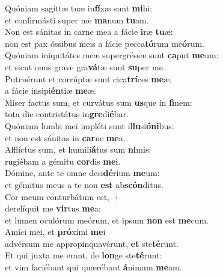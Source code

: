 \evenverse Quóniam sagíttæ tuæ in\textbf{fí}xæ sunt \textbf{mi}hi:~\*\\
\evenverse et confirmásti super me \textbf{ma}num \textbf{tu}am.\\
\oddverse Non est sánitas in carne mea a fácie \textbf{i}ræ \textbf{tu}æ:~\*\\
\oddverse non est pax óssibus meis a fácie pecca\textbf{tó}rum me\textbf{ó}rum.\\
\evenverse Quóniam iniquitátes meæ supergréssæ sunt \textbf{ca}put \textbf{me}um:~\*\\
\evenverse et sicut onus grave gra\textbf{vá}tæ sunt \textbf{su}per me.\\
\oddverse Putruérunt et corrúptæ sunt cica\textbf{trí}ces \textbf{me}æ,~\*\\
\oddverse a fácie insipi\textbf{én}tiæ \textbf{me}æ.\\
\evenverse Miser factus sum, et curvátus sum \textbf{us}que in \textbf{fi}nem:~\*\\
\evenverse tota die contristátus in\textbf{gre}di\textbf{é}bar.\\
\oddverse Quóniam lumbi mei impléti sunt il\textbf{lu}si\textbf{ó}\textbf{ni}bus:~\*\\
\oddverse et non est sánitas in \textbf{car}ne \textbf{me}a.\\
\evenverse Afflíctus sum, et humili\textbf{á}tus sum \textbf{ni}mis:~\*\\
\evenverse rugiébam a gémitu \textbf{cor}dis \textbf{me}i.\\
\oddverse Dómine, ante te omne desi\textbf{dé}rium \textbf{me}um:~\*\\
\oddverse et gémitus meus a te non \textbf{est} ab\textbf{scón}ditus.\\
\evenverse Cor meum conturbátum est,~+\\
\evenverse  derelíquit me \textbf{vir}tus \textbf{me}a:~\*\\
\evenverse et lumen oculórum meórum, et ipsum \textbf{non} est \textbf{me}cum.\\
\oddverse Amíci mei, et \textbf{pró}ximi \textbf{me}i~\*\\
\oddverse advérsum me appropinquavérunt, \textbf{et} ste\textbf{té}runt.\\
\evenverse Et qui juxta me erant, de \textbf{lon}ge ste\textbf{té}runt:~\*\\
\evenverse et vim faciébant qui quærébant \textbf{á}nimam \textbf{me}am.\\
